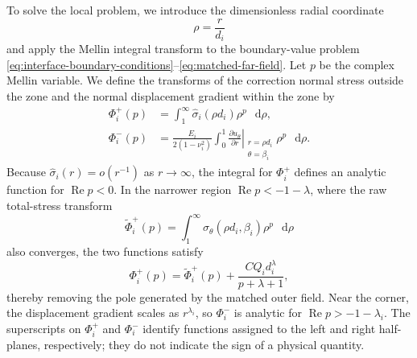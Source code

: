 \documentclass[pdflatex,onecolumn,sn-mathphys-ay]{sn-jnl}
\newcommand{\dd}{\mathop{}\!\mathrm{d}}
\begin{document}
To solve the local problem, we introduce the dimensionless radial coordinate
\begin{equation*}
  \rho=\frac{r}{d_i}
\end{equation*}
and apply the Mellin integral transform to the boundary-value problem
\eqref{eq:interface-boundary-conditions}--\eqref{eq:matched-far-field}.
Let $p$ be the complex Mellin variable. We define the transforms of the
correction normal stress outside the zone and the normal displacement
gradient within the zone by
\begin{equation*}
\begin{aligned}
  \Phi_i^+(p)
    &=\int_1^\infty
      \widehat{\sigma}_i(\rho d_i)\rho^p\,\dd\rho,\\
  \Phi_i^-(p)
    &=\frac{E_i}{2(1-\nu_i^2)}
      \int_0^1
      \left.
      \frac{\partial u_\theta}{\partial r}
      \right|_{\substack{r=\rho d_i\\\theta=\beta_i}}
      \rho^p\,\dd\rho.
\end{aligned}
\end{equation*}
Because $\widehat{\sigma}_i(r)=o(r^{-1})$ as $r\to\infty$, the integral
for $\Phi_i^+$ defines an analytic function for
$\operatorname{Re}p<0$. In the narrower region
$\operatorname{Re}p<-1-\lambda$, where the raw total-stress transform
\begin{equation*}
  \widetilde{\Phi}_i^+(p)
  =\int_1^\infty
    \sigma_\theta(\rho d_i,\beta_i)\rho^p\,\dd\rho
\end{equation*}
also converges, the two functions satisfy
\begin{equation*}
  \Phi_i^+(p)
  =\widetilde{\Phi}_i^+(p)
   +\frac{CQ_i d_i^\lambda}{p+\lambda+1},
\end{equation*}
thereby removing the pole generated by the matched outer field. Near the
corner, the displacement gradient scales as $r^{\lambda_i}$, so
$\Phi_i^-$ is analytic for $\operatorname{Re}p>-1-\lambda_i$. The superscripts on $\Phi_i^+$ and
$\Phi_i^-$ identify functions assigned to the left and right half-planes,
respectively; they do not indicate the sign of a physical quantity.
\end{document}
